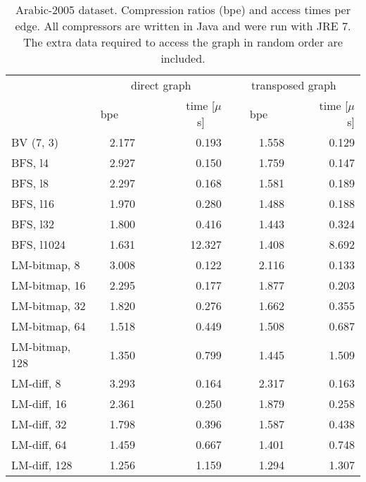 \documentclass[envcountsame]{llncs}
\begin{document}
\begin{table}
\centering
\begin{tabular}{lrrrr}
\hline
        & \multicolumn{2}{c}{direct graph} & \multicolumn{2}{c}{transposed graph} \\
\cline{2-5}
        &  bpe~~~&~~~time [$\mu$s]~~~&~~~bpe~~~&~~~time [$\mu$s] \\
BV (7, 3) & 2.177 & 0.193 & 1.558 & 0.129 \\
BFS, l4 & 2.927 & 0.150 & 1.759 & 0.147 \\
BFS, l8 & 2.297 & 0.168 & 1.581 & 0.189 \\
BFS, l16 & 1.970 & 0.280 & 1.488 & 0.188 \\
BFS, l32 & 1.800 & 0.416 & 1.443 & 0.324 \\
BFS, l1024 & 1.631 & 12.327 & 1.408 & 8.692 \\
LM-bitmap, 8 & 3.008 & 0.122 & 2.116 & 0.133 \\ 
LM-bitmap, 16 & 2.295 & 0.177 & 1.877 & 0.203 \\
LM-bitmap, 32 & 1.820 & 0.276 & 1.662 & 0.355 \\ 
LM-bitmap, 64 & 1.518 & 0.449 & 1.508 & 0.687 \\
LM-bitmap, 128 & 1.350 & 0.799 & 1.445 & 1.509 \\ 
LM-diff, 8 & 3.293 & 0.164 & 2.317 & 0.163 \\
LM-diff, 16 & 2.361 & 0.250 & 1.879 & 0.258 \\
LM-diff, 32 & 1.798 & 0.396 & 1.587 & 0.438 \\ 
LM-diff, 64 & 1.459 & 0.667 & 1.401 & 0.748 \\ 
LM-diff, 128 & 1.256 & 1.159 & 1.294 & 1.307 \\
\hline
\end{tabular}
\vspace{4mm}
\caption{Arabic-2005 dataset. Compression ratios (bpe) and access times per edge. 
All compressors are written in Java and were run with JRE 7.
The extra data required to access the graph in random order are included.
}
\label{table:app_arabic}
\end{table}
\end{document}
